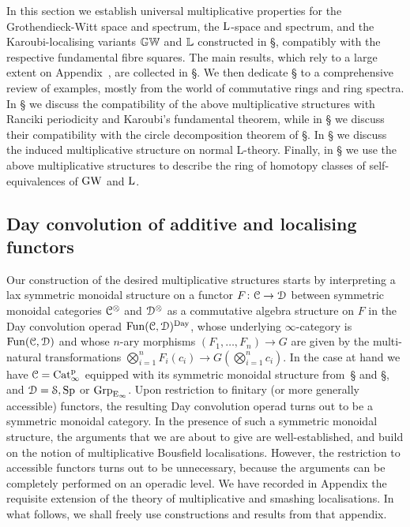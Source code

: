 
In this section we establish universal multiplicative properties for the Grothendieck-Witt space and spectrum, the $\operatorname L$-space and spectrum, and the Karoubi-localising variants $\mathbb{GW}$ and $\mathbb{L}$ constructed in \S{}, compatibly with the respective fundamental fibre squares. The main results, which rely to a large extent on Appendix~, are collected in \S{}. We then dedicate \S{} to a comprehensive review of examples, mostly from the world of commutative rings and ring spectra. In \S{} we discuss the compatibility of the above multiplicative structures with Ranciki periodicity and Karoubi's fundamental theorem, while in \S{} we discuss their compatibility with the circle decomposition theorem of \S{}. In \S{} we discuss the induced multiplicative structure on normal L-theory. Finally, in \S{} we use the above multiplicative structures to describe the ring of homotopy classes of self-equivalences of $\operatorname{GW}$ and $\operatorname L$.



 



\subsection{Day convolution of additive and localising functors}
\label{subsection:multiplicative-GW}%
\label{subsection:multiplicative-L}%
\label{subsection:mult-tate}%


Our construction of the desired multiplicative structures starts by interpreting a lax symmetric monoidal structure on a functor $F\colon \mathcal C\to \mathcal{D}$ between symmetric monoidal categories $\mathcal C^\otimes$ and $\mathcal{D}^\otimes$ as a commutative algebra structure on $F$ in the Day convolution operad $\operatorname{Fun}(\mathcal C, \mathcal{D})^{\mathrm{Day}}$, whose underlying $\infty$-category is $\operatorname{Fun}(\mathcal C, \mathcal{D})$ and whose $n$-ary morphisms $(F_1, \dots, F_n)\to G$ are given by the multi-natural transformations $\bigotimes_{i=1}^n F_i(c_i) \to G(\bigotimes_{i=1}^n c_i)$. In the case at hand we have $\mathcal C=\mathrm{Cat}^{\mathrm p}_\infty$ equipped with its symmetric monoidal structure from~\S {} and \S {}, and $\mathcal{D} = \mathcal S, \mathrm{Sp}$ or $\operatorname{Grp}_{\mathrm{E}_{\infty}}$. Upon restriction to finitary (or more generally accessible) functors, the resulting Day convolution operad turns out to be a symmetric monoidal category. In the presence of such a symmetric monoidal structure, the arguments that we are about to give are well-established, and build on the notion of multiplicative Bousfield localisations. However, the restriction to accessible functors turns out to be unnecessary, because the arguments can be completely performed on an operadic level. We have recorded in Appendix  %
the requisite extension of the theory of multiplicative and smashing localisations. In what follows, we shall freely use constructions and results from that appendix.


